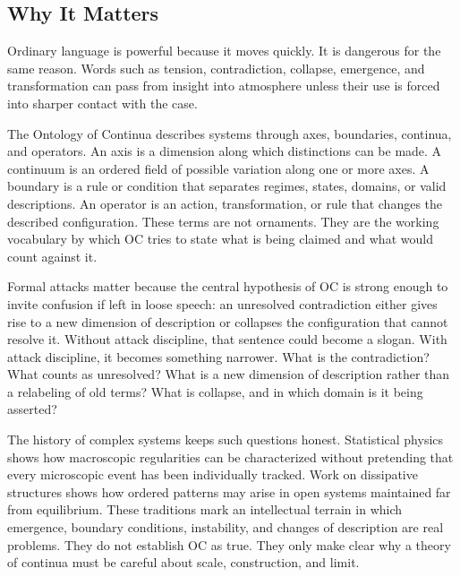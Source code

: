 \documentclass[11pt,a4paper,openany]{book}
\begin{document}
\subsection{Why It Matters}
Ordinary language is powerful because it moves quickly. It is dangerous for the same reason. Words such as tension, contradiction, collapse, emergence, and transformation can pass from insight into atmosphere unless their use is forced into sharper contact with the case. \cite{kadanoff_scaling,wilson_renormalization}\par
The Ontology of Continua describes systems through axes, boundaries, continua, and operators. An axis is a dimension along which distinctions can be made. A continuum is an ordered field of possible variation along one or more axes. A boundary is a rule or condition that separates regimes, states, domains, or valid descriptions. An operator is an action, transformation, or rule that changes the described configuration. These terms are not ornaments. They are the working vocabulary by which OC tries to state what is being claimed and what would count against it.\par
Formal attacks matter because the central hypothesis of OC is strong enough to invite confusion if left in loose speech: an unresolved contradiction either gives rise to a new dimension of description or collapses the configuration that cannot resolve it. Without attack discipline, that sentence could become a slogan. With attack discipline, it becomes something narrower. What is the contradiction? What counts as unresolved? What is a new dimension of description rather than a relabeling of old terms? What is collapse, and in which domain is it being asserted?\par
The history of complex systems keeps such questions honest. Statistical physics shows how macroscopic regularities can be characterized without pretending that every microscopic event has been individually tracked. Work on dissipative structures shows how ordered patterns may arise in open systems maintained far from equilibrium. These traditions mark an intellectual terrain in which emergence, boundary conditions, instability, and changes of description are real problems. They do not establish OC as true. They only make clear why a theory of continua must be careful about scale, construction, and limit.\par
\end{document}

